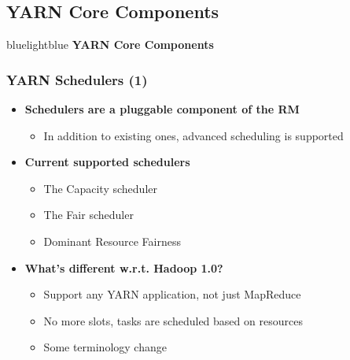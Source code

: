 \subsection{YARN Core Components}
\begin{frame}
 \begin{colorblock}{blue}{lightblue}{ }
    \Large \textbf{YARN Core Components}
  \end{colorblock}
\end{frame}

\begin{frame}
\frametitle{YARN Schedulers (1)}
\begin{itemize}
  \item {\bf Schedulers are a pluggable component of the RM}
  \begin{itemize}
    \item In addition to existing ones, advanced scheduling is supported
  \end{itemize}
  \item {\bf Current supported schedulers}
  \begin{itemize}
    \item The Capacity scheduler
    \item The Fair scheduler
    \item Dominant Resource Fairness
  \end{itemize}
  \item {\bf What's different w.r.t. Hadoop 1.0?}
  \begin{itemize}
    \item Support any YARN application, not just MapReduce
    \item No more slots, tasks are scheduled based on resources
    \item Some terminology change
  \end{itemize}
\end{itemize}
\end{frame}

